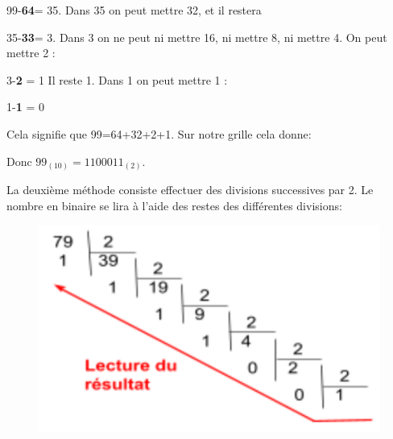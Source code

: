 \documentclass[11pt, a4paper]{book}
\begin{document}
99-\textbf{64}= 35. Dans 35 on peut mettre 32, et il restera 

35-\textbf{33}= 3. Dans 3 on ne peut ni mettre 16, ni mettre 8, ni mettre 4. On peut mettre 2 :

3-\textbf{2} = 1 Il reste 1. Dans 1 on peut mettre 1 :

1-\textbf{1} = 0

Cela signifie que 99=64+32+2+1. Sur notre grille cela donne:

\begin{center}
\end{center}

Donc $99_{(10)}=1100011_{(2)}$.


\;

La deuxième méthode consiste  effectuer des divisions successives par 2. Le nombre en binaire se lira à l'aide des restes des différentes divisions:

\begin{figure}[h]
\begin{center}
\includegraphics[scale=.5]{images/divisionbinaire}
\end{center}
\end{figure}
\end{document}
